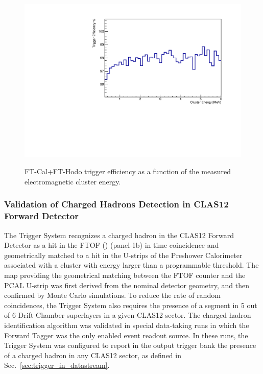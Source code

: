 \begin{figure}[!htb]
 \centering
{\includegraphics[width=.5\textwidth]{img/FT_ClusterEfficiencyHODO.pdf}}
 \caption{FT-Cal+FT-Hodo trigger efficiency as a function of the measured electromagnetic cluster energy.}
 \label{fig:FT_ClusterEfficiencyHODO}
\end{figure}

\subsubsection{Validation of Charged Hadrons Detection in CLAS12 Forward Detector}

The Trigger System recognizes a charged hadron in the CLAS12 Forward Detector as a hit in the FTOF (\cite{ftof-ref}) (panel-1b) in time coincidence and geometrically matched to a hit in the U-strips of the Preshower Calorimeter \cite{ec-ref} associated with a cluster with energy larger than a programmable threshold. The map providing the geometrical matching between the FTOF counter and the PCAL U-strip was first derived from the nominal detector geometry, and then confirmed by Monte Carlo simulations. To reduce the rate of random coincidences, the Trigger System also requires the presence of a segment in 5 out of 6 Drift Chamber superlayers in a given CLAS12 sector. The charged hadron identification algorithm was validated in special data-taking runs in which the Forward Tagger was the only enabled event readout source. In these runs, the Trigger System was configured to report in the output trigger bank the presence of a charged hadron in any CLAS12 sector, as defined in Sec.~\ref{sec:trigger_in_datastream}. 

